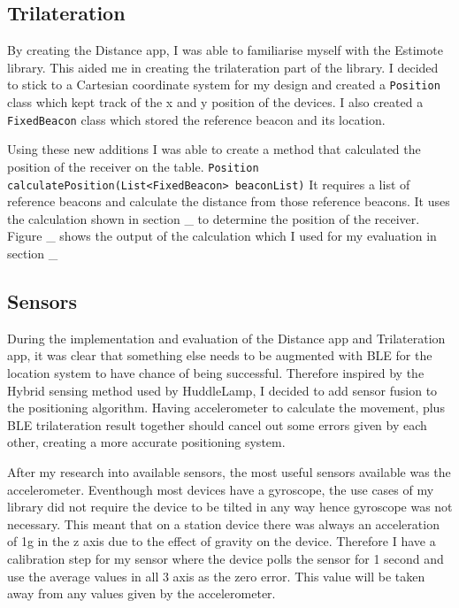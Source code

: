 \subsection{Trilateration}

By creating the Distance app, I was able to familiarise myself with the Estimote library. This aided me in creating the trilateration part of the library. I decided to stick to a Cartesian coordinate system for my design and created a \lstinline|Position| class which kept track of the x and y position of the devices. I also created a \lstinline|FixedBeacon| class which stored the reference beacon and its location.

Using these new additions I was able to create a method that calculated the position of the receiver on the table. \lstinline|Position calculatePosition(List<FixedBeacon> beaconList)| It requires a list of reference beacons and calculate the distance from those reference beacons. It uses the calculation shown in section \_ to determine the position of the receiver. 
Figure \_ shows the output of the calculation which I used for my evaluation in section \_

\subsection{Sensors}
During the implementation and evaluation of the Distance app and Trilateration app, it was clear that something else needs to be augmented with BLE for the location system to have chance of being successful. Therefore inspired by the Hybrid sensing method used by HuddleLamp, I decided to add sensor fusion to the positioning algorithm. Having accelerometer to calculate the movement, plus BLE trilateration result together should cancel out some errors given by each other, creating a more accurate positioning system.

After my research into available sensors, the most useful sensors available was the accelerometer. Eventhough most devices have a gyroscope, the use cases of my library did not require the device to be tilted in any way hence gyroscope was not necessary. This meant that on a station device there was always an acceleration of 1g in the z axis due to the effect of gravity on the device. Therefore I have a calibration step for my sensor where the device polls the sensor for 1 second and use the average values in all 3 axis as the zero error. This value will be taken away from any values given by the accelerometer.

